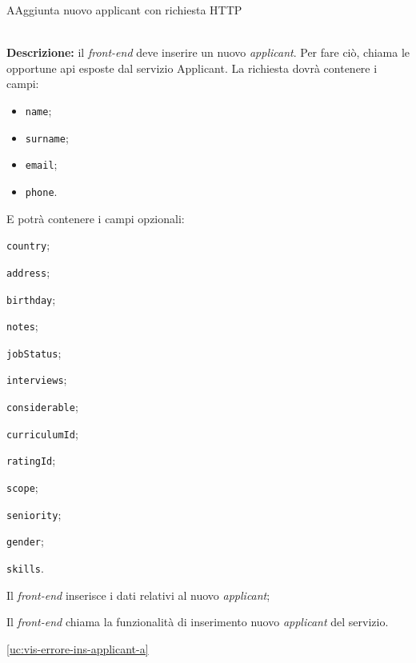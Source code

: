 \begin{usecase}{7}{A}{Aggiunta nuovo applicant con richiesta HTTP}


	\textbf{\\Descrizione:} il \textit{front-end} deve inserire un nuovo \textit{applicant}. Per fare ciò,
	chiama le opportune \acrshort{api} esposte dal servizio Applicant. La richiesta dovrà contenere i campi:
	\begin{itemize}[noitemsep]
		\item \texttt{name};
		\item \texttt{surname};
		\item \texttt{email};
		\item \texttt{phone}.
	\end{itemize}
	E potrà contenere i campi opzionali:
	\begin{ucitemize}
		\item \texttt{country};
		\item \texttt{address};
		\item \texttt{birthday};
		\item \texttt{notes};
		\item \texttt{jobStatus};
		\item \texttt{interviews};
		\item \texttt{considerable};
		\item \texttt{curriculumId};
		\item \texttt{ratingId};
		\item \texttt{scope};
		\item \texttt{seniority};
		\item \texttt{gender};
		\item \texttt{skills}.
	\end{ucitemize}

	\begin{ucscenarioprincipale}
		\item Il \textit{front-end} inserisce i dati relativi al nuovo \textit{applicant};
		\item Il \textit{front-end} chiama la funzionalità di inserimento nuovo \textit{applicant} del servizio.
	\end{ucscenarioprincipale}


	\begin{ucestensioni}
		\item \ref{uc:vis-errore-ins-applicant-a}
	\end{ucestensioni}

	\label{uc:richiesta-aggiunta-applicant-a}
\end{usecase}

